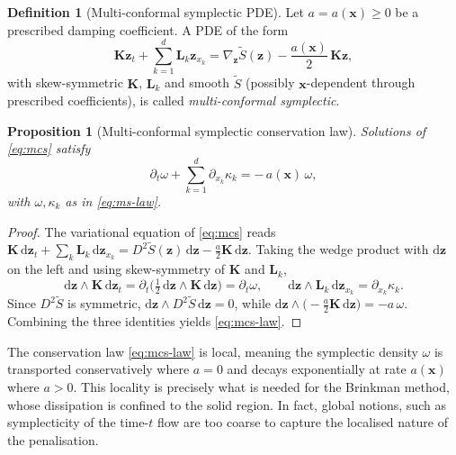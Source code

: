 \documentclass[11pt]{article}
\newtheorem{proposition}[theorem]{Proposition}
\theoremstyle{definition}
\newtheorem{definition}[theorem]{Definition}
\theoremstyle{remark}
\newcommand{\dd}{\mathrm{d}}
\newcommand{\bz}{\bm{z}}
\newcommand{\bx}{\bm{x}}
\newcommand{\bK}{\bm{K}}
\newcommand{\bL}{\bm{L}}
\begin{document}
\begin{definition}[Multi-conformal symplectic PDE]
\label{def:mcs}
Let $a=a(\bx)\ge0$ be a prescribed damping coefficient.  A PDE of the
form
\begin{equation}
\label{eq:mcs}
\bK\bz_t + \sum_{k=1}^{d}\bL_k\bz_{x_k}
= \nabla_{\bz} \widetilde S(\bz) - \frac{a(\bx)}{2}\,\bK\bz ,
\end{equation}
with skew-symmetric $\bK$, $\bL_k$ and smooth $\widetilde S$ (possibly
$\bx$-dependent through prescribed coefficients), is called
\emph{multi-conformal symplectic}.
\end{definition}

\begin{proposition}[Multi-conformal symplectic conservation law]
\label{prop:mcs-law}
Solutions of \eqref{eq:mcs} satisfy
\begin{equation}
\label{eq:mcs-law}
\partial_t \omega + \sum_{k=1}^{d}\partial_{x_k} \kappa_k
= -\,a(\bx)\,\omega ,
\end{equation}
with $\omega,\kappa_k$ as in \eqref{eq:ms-law}.
\end{proposition}

\begin{proof}
The variational equation of \eqref{eq:mcs} reads
$\bK\,\dd\bz_t + \sum_k\bL_k\,\dd\bz_{x_k}
= D^2\widetilde S(\bz)\,\dd\bz - \tfrac{a}{2}\bK\,\dd\bz$.  Taking the
wedge product with $\dd\bz$ on the left and using skew-symmetry of
$\bK$ and $\bL_k$,
\[
\dd\bz\wedge\bK\,\dd\bz_t = \partial_t\bigl(\tfrac12\,
\dd\bz\wedge\bK\,\dd\bz\bigr)=\partial_t\omega,
\qquad
\dd\bz\wedge\bL_k\,\dd\bz_{x_k} = \partial_{x_k}\kappa_k .
\]
Since $D^2\widetilde S$ is symmetric,
$\dd\bz\wedge D^2\widetilde S\,\dd\bz=0$, while
$\dd\bz\wedge\bigl(-\tfrac{a}{2}\bK\,\dd\bz\bigr) = -a\,\omega$.
Combining the three identities yields \eqref{eq:mcs-law}.
\end{proof}

The conservation law \eqref{eq:mcs-law} is local, meaning the
symplectic density $\omega$ is transported conservatively where $a=0$
and decays exponentially at rate $a(\bx)$ where $a>0$.  This locality
is precisely what is needed for the Brinkman method, whose dissipation
is confined to the solid region. In fact, global notions, such as symplecticity of the time-$t$ flow are too coarse to capture the localised nature of the penalisation.

\end{document}

